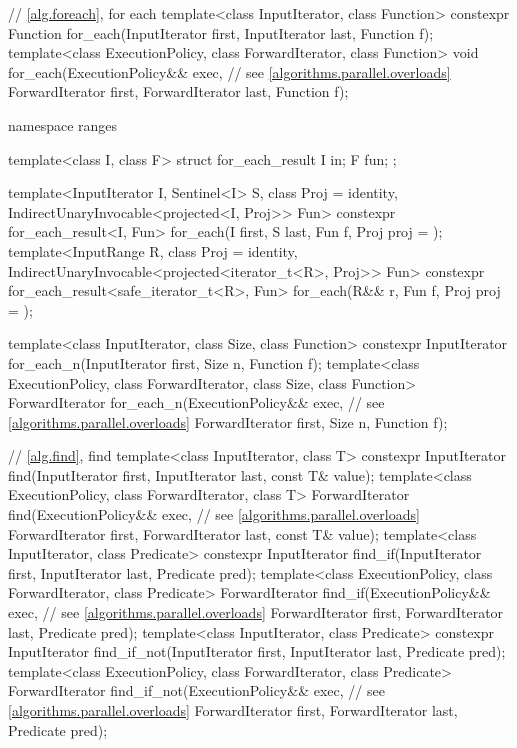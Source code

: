\begin{codeblock}
{  // \ref{alg.foreach}, for each
  template<class InputIterator, class Function>
    constexpr Function for_each(InputIterator first, InputIterator last, Function f);
  template<class ExecutionPolicy, class ForwardIterator, class Function>
    void for_each(ExecutionPolicy&& exec, // see \ref{algorithms.parallel.overloads}
                  ForwardIterator first, ForwardIterator last, Function f);

  namespace ranges {
    template<class I, class F>
    struct for_each_result {
      I in;
      F fun;
    };

    template<InputIterator I, Sentinel<I> S, class Proj = identity,
        IndirectUnaryInvocable<projected<I, Proj>> Fun>
      constexpr for_each_result<I, Fun>
        for_each(I first, S last, Fun f, Proj proj = {});
    template<InputRange R, class Proj = identity,
        IndirectUnaryInvocable<projected<iterator_t<R>, Proj>> Fun>
      constexpr for_each_result<safe_iterator_t<R>, Fun>
        for_each(R&& r, Fun f, Proj proj = {});
  }

  template<class InputIterator, class Size, class Function>
    constexpr InputIterator for_each_n(InputIterator first, Size n, Function f);
  template<class ExecutionPolicy, class ForwardIterator, class Size, class Function>
    ForwardIterator for_each_n(ExecutionPolicy&& exec, // see \ref{algorithms.parallel.overloads}
                               ForwardIterator first, Size n, Function f);

  // \ref{alg.find}, find
  template<class InputIterator, class T>
    constexpr InputIterator find(InputIterator first, InputIterator last,
                                 const T& value);
  template<class ExecutionPolicy, class ForwardIterator, class T>
    ForwardIterator find(ExecutionPolicy&& exec, // see \ref{algorithms.parallel.overloads}
                         ForwardIterator first, ForwardIterator last,
                         const T& value);
  template<class InputIterator, class Predicate>
    constexpr InputIterator find_if(InputIterator first, InputIterator last,
                                    Predicate pred);
  template<class ExecutionPolicy, class ForwardIterator, class Predicate>
    ForwardIterator find_if(ExecutionPolicy&& exec, // see \ref{algorithms.parallel.overloads}
                            ForwardIterator first, ForwardIterator last,
                            Predicate pred);
  template<class InputIterator, class Predicate>
    constexpr InputIterator find_if_not(InputIterator first, InputIterator last,
                                        Predicate pred);
  template<class ExecutionPolicy, class ForwardIterator, class Predicate>
    ForwardIterator find_if_not(ExecutionPolicy&& exec, // see \ref{algorithms.parallel.overloads}
                                ForwardIterator first, ForwardIterator last,
                                Predicate pred);

}
\end{codeblock}
